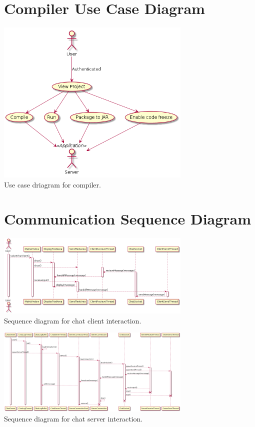\documentclass[11pt]{article}
\begin{document}
\section{Compiler Use Case Diagram}
    \begin{minipage}{1\textwidth}
        \begin{center}
            \includegraphics[width=0.7\textwidth]{uml-diagram/usecase-compiler} \\
            Use case driagram for compiler.
        \end{center}
    \end{minipage}

\section{Communication Sequence Diagram}
    \begin{minipage}{1\textwidth}
        \begin{center}
            \includegraphics[width=0.7\textwidth]{uml-diagram/sequence-chat-client} \\
            Sequence diagram for chat client interaction.
        \end{center}
        \begin{center}
            \includegraphics[width=0.7\textwidth]{uml-diagram/sequence-chat-server} \\
            Sequence diagram for chat server interaction.
        \end{center}
    \end{minipage}
\end{document}

